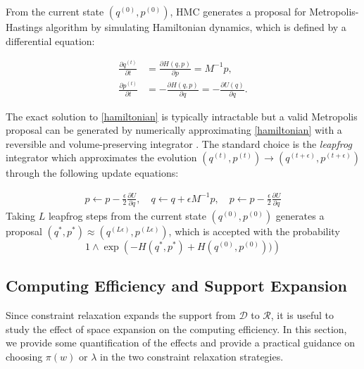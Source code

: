 \documentclass[10pt,fleqn]{article}
\newcommand{\mc}[1]{\mathcal{#1}}
\DeclareMathOperator{\1}{\mathbbm{1}}
\newcommand{\dt}{\epsilon} %
\newcommand{\mass}{M} %
\begin{document}
From the current state $(q^{(0)},p^{(0)})$, HMC generates a proposal for Metropolis-Hastings algorithm by simulating Hamiltonian dynamics, which is defined by a differential equation:

\begin{equation}
\begin{aligned}
\label{hamiltonian}
\frac{\partial q ^{(t)}}{\partial t} & =\frac{\partial H(q, p)}{\partial p} = \mass^{-1}p,\\
\frac{\partial p^{(t)}}{\partial t}& =-\frac{\partial H(q, p)}{\partial q} = -\frac{\partial U(q)}{\partial q}.
\end{aligned}
\end{equation}

The exact solution to \eqref{hamiltonian} is typically intractable but a valid Metropolis proposal can be generated by numerically approximating \eqref{hamiltonian} with a reversible and volume-preserving  integrator \citep{neal2011mcmc}. The standard choice is the \textit{leapfrog} integrator which approximates the evolution $(q^{(t)},p^{(t)}) \to (q^{(t + \dt)},p^{(t + \dt)})$ through the following update equations:

\begin{equation}
\begin{aligned}
\label{leap-frog}
p \leftarrow p - \frac{\dt}{2} \frac{\partial U}{\partial  q },\quad
q \leftarrow  q  + \dt \mass^{-1}p,\quad
p \leftarrow p -  \frac{\dt}{2}  \frac{\partial U}{\partial  q } 
\end{aligned}
\end{equation}
Taking $L$ leapfrog steps from the current state $(q^{(0)},p^{(0)})$ generates a proposal $(q^{*},p^{*}) \approx (q^{(L \dt)},p^{(L \dt)})$, which is accepted with the probability 
$$1\wedge \exp  \left( - H(q^{*},p^{*}) + H(q^{(0)},p^{(0)}))\right)$$


\subsection{Computing Efficiency and Support Expansion}

Since constraint relaxation expands the support from $\mc D$ to $\mc
R$, it is useful to study the effect of space expansion on the computing efficiency. In this section, we provide some  quantification of the effects and provide a practical guidance on choosing $\pi(w)$ or $\lambda$ in the two constraint relaxation strategies.
\end{document}
